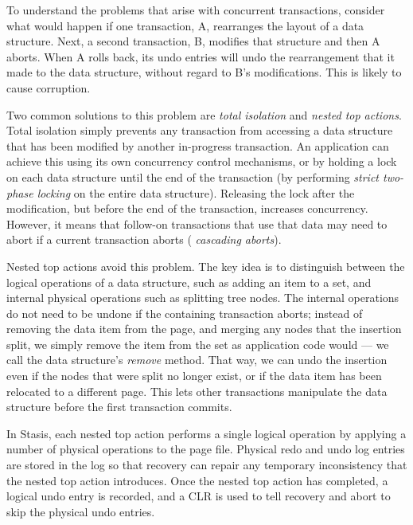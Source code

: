 \documentclass[letterpaper,twocolumn,10pt]{article}
\newcommand{\yad}{Stasis\xspace}
\begin{document}
To understand the problems that arise with concurrent transactions,
consider what would happen if one transaction, A, rearranges the
layout of a data structure.  Next, a second transaction, B,
modifies that structure and then A aborts.  When A rolls back, its
undo entries will undo the rearrangement that it made to the data
structure, without regard to B's modifications.  This is likely to
cause corruption.

Two common solutions to this problem are {\em total isolation} and
{\em nested top actions}.  Total isolation simply prevents any
transaction from accessing a data structure that has been modified by
another in-progress transaction.  An application can achieve this
using its own concurrency control mechanisms, or by holding a lock on
each data structure until the end of the transaction (by performing {\em strict two-phase locking} on the entire data structure).  
Releasing the
lock after the modification, but before the end of the transaction,
increases concurrency.  However, it means that follow-on transactions that use
that data may need to abort if a current transaction aborts ({\em
cascading aborts}). 


Nested top actions avoid this problem.  The key idea is to distinguish
between the logical operations of a data structure, such as
adding an item to a set, and internal physical operations such as
splitting tree nodes. 
The internal operations do not need to be undone if the
containing transaction aborts; instead of removing the data item from
the page, and merging any nodes that the insertion split, we simply
remove the item from the set as application code would --- we call the
data structure's {\em remove} method.  That way, we can undo the
insertion even if the nodes that were split no longer exist, or if the
data item has been relocated to a different page.  This
lets other transactions manipulate the data structure before the first
transaction commits.

In \yad, each nested top action performs a single logical operation by applying
a number of physical operations to the page file.  Physical redo and undo log entries are stored in the log so that recovery can repair any
temporary inconsistency that the nested top action introduces.  Once
the nested top action has completed, a logical undo entry is recorded,
and a CLR is used to tell recovery and abort to skip the physical
undo entries.
\end{document}
